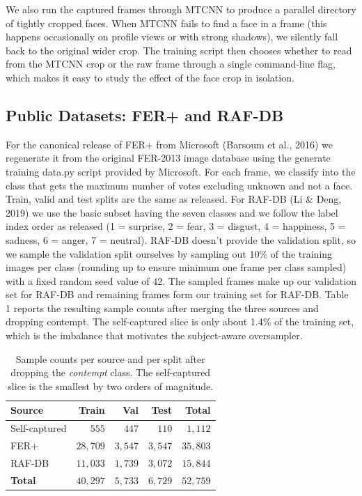 \documentclass[12pt,a4paper]{article}
\begin{document}
We also run the captured frames through MTCNN
\autocite{zhang2016mtcnn} to produce a parallel directory of
tightly cropped faces. When MTCNN fails to find a face in a
frame (this happens occasionally on profile views or with
strong shadows), we silently fall back to the original wider
crop. The training script then chooses whether to read from the
MTCNN crop or the raw frame through a single command-line
flag, which makes it easy to study the effect of the face
crop in isolation.

\subsection{Public Datasets: FER+ and RAF-DB}
\label{sec:data:public}

For the canonical release of FER+ from Microsoft (Barsoum et al., 2016) we regenerate it from the original FER-2013 image database using the generate training data.py script provided by Microsoft. For each frame, we classify into the class that gets the maximum number of votes excluding unknown and not a face. Train, valid and test splits are the same as released.
For RAF-DB (Li \& Deng, 2019) we use the basic subset having the seven classes and we follow the label index order as released (1 = surprise, 2 = fear, 3 = disgust, 4 = happiness, 5 = sadness, 6 = anger, 7 = neutral). RAF-DB doesn't provide the validation split, so we sample the validation split ourselves by sampling out 10\% of the training images per class (rounding up to ensure minimum one frame per class sampled) with a fixed random seed value of 42. The sampled frames make up our validation set for RAF-DB and remaining frames form our training set for RAF-DB.
Table 1 reports the resulting sample counts after merging the three sources and dropping
contempt. The self-captured slice is only about 1.4\% of the training set, which is the
imbalance that motivates the subject-aware oversampler.

\begin{table}[H]
  \centering
  \footnotesize
  \begin{tabular}{lrrrr}
    \toprule
    Source & Train & Val & Test & Total \\
    \midrule
    Self-captured & $555$  & $447$  & $110$  & $1{,}112$ \\
    FER+          & $28{,}709$ & $3{,}547$ & $3{,}547$ & $35{,}803$ \\
    RAF-DB        & $11{,}033$ & $1{,}739$ & $3{,}072$ & $15{,}844$ \\
    \midrule
    \textbf{Total} & $40{,}297$ & $5{,}733$ & $6{,}729$ & $52{,}759$ \\
    \bottomrule
  \end{tabular}
  \caption{\footnotesize Sample counts per source and per split after dropping
  the \emph{contempt} class. The self-captured slice is the
  smallest by two orders of magnitude.}
  \label{tab:datasummary}
\end{table}
\end{document}
